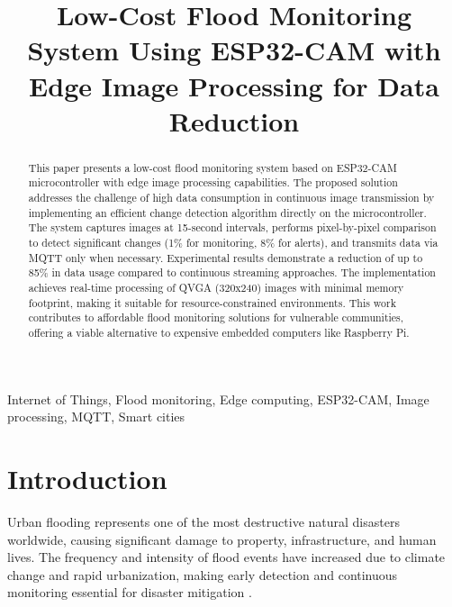 \documentclass[conference]{IEEEtran}
\begin{document}
\title{Low-Cost Flood Monitoring System Using ESP32-CAM with Edge Image Processing for Data Reduction}

\author{
\and
{}
}

\maketitle

\begin{abstract}
This paper presents a low-cost flood monitoring system based on ESP32-CAM microcontroller with edge image processing capabilities. The proposed solution addresses the challenge of high data consumption in continuous image transmission by implementing an efficient change detection algorithm directly on the microcontroller. The system captures images at 15-second intervals, performs pixel-by-pixel comparison to detect significant changes (1\% for monitoring, 8\% for alerts), and transmits data via MQTT only when necessary. Experimental results demonstrate a reduction of up to 85\% in data usage compared to continuous streaming approaches. The implementation achieves real-time processing of QVGA (320x240) images with minimal memory footprint, making it suitable for resource-constrained environments. This work contributes to affordable flood monitoring solutions for vulnerable communities, offering a viable alternative to expensive embedded computers like Raspberry Pi.
\end{abstract}

\begin{IEEEkeywords}
Internet of Things, Flood monitoring, Edge computing, ESP32-CAM, Image processing, MQTT, Smart cities
\end{IEEEkeywords}

\section{Introduction}
Urban flooding represents one of the most destructive natural disasters worldwide, causing significant damage to property, infrastructure, and human lives. The frequency and intensity of flood events have increased due to climate change and rapid urbanization, making early detection and continuous monitoring essential for disaster mitigation \cite{arshad2019computer}.
\end{document}
